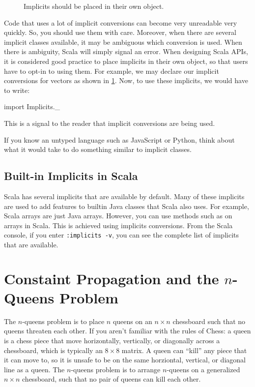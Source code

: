 \documentclass[9pt]{extbook}
\begin{document}
\begin{figure}
\caption{Implicits should be placed in their own object.}
\label{vectorimplicits}
\end{figure}


Code that uses a lot of implicit conversions can become
very unreadable very quickly. So, you should use them with care.
Moreover, when there are several implicit classes available,
it may be ambiguous which conversion is used. When there is
ambiguity, Scala will simply signal an error.
When designing Scala APIs, it is considered good practice to place implicits in
their own object, so that users have to opt-in to using them. For example,
we may declare our implicit conversions for vectors as shown in
\cref{vectorimplicits}. Now, to use these implicits, we would have to
write:
\begin{scalacode}
import Implicits._
\end{scalacode}
This is a signal to the reader that implicit conversions are being used.

\begin{think}
If you know an untyped language such as JavaScript or Python, think about what
it would take to do something similar to implicit classes.
\end{think}

\section{Built-in Implicits in Scala}

Scala has several implicits that are available by default. Many of these
implicits are used to add features to builtin Java classes that Scala
also uses. For example, Scala arrays are just Java arrays. However,
you can use methods such as  on arrays in Scala.
This is achieved using implicits conversions.  From the Scala console,
if you enter \lstinline[language=console]{:implicits -v}, you can see the complete
list of implicits that are available.

\chapter{Constaint Propagation and the $n$-Queens Problem}

The $n$-queens problem is to place $n$ queens on an $n \times n$ chessboard
such that no queens threaten each other.
If you aren't familiar with the
rules of Chess: a queen is a chess piece that move horizontally, vertically,
or diagonally across a chessboard, which is typically an $8 \times 8$ matrix.
A queen can ``kill'' any piece that it can move to, so it is unsafe to be
on the same horziontal, vertical, or diagonal line as a queen. The $n$-queens
problem is to arrange $n$-queens on a generalized $n \times n$ chessboard,
such that no pair of queens can kill each other.
\end{document}
